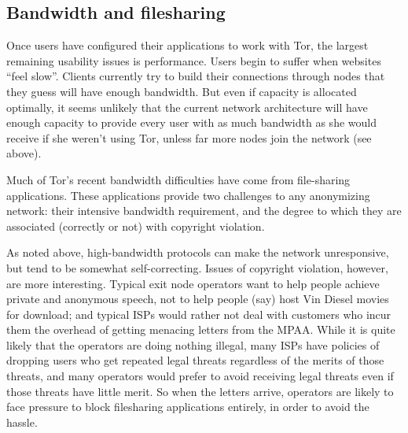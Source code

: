 \documentclass{llncs}
\begin{document}


\subsection{Bandwidth and filesharing}
\label{subsec:bandwidth-and-filesharing}
Once users have configured their applications to work with Tor, the largest
remaining usability issues is performance.  Users begin to suffer
when websites ``feel slow''.
Clients currently try to build their connections through nodes that they
guess will have enough bandwidth.  But even if capacity is allocated
optimally, it seems unlikely that the current network architecture will have
enough capacity to provide every user with as much bandwidth as she would
receive if she weren't using Tor, unless far more nodes join the network
(see above).


Much of Tor's recent bandwidth difficulties have come from file-sharing
applications.  These applications provide two challenges to
any anonymizing network: their intensive bandwidth requirement, and the
degree to which they are associated (correctly or not) with copyright
violation.

As noted above, high-bandwidth protocols can make the network unresponsive,
but tend to be somewhat self-correcting.  Issues of copyright violation,
however, are more interesting.  Typical exit node operators want to help
people achieve private and anonymous speech, not to help people (say) host
Vin Diesel movies for download; and typical ISPs would rather not
deal with customers who incur them the overhead of getting menacing letters
from the MPAA\@.  While it is quite likely that the operators are doing nothing
illegal, many ISPs have policies of dropping users who get repeated legal
threats regardless of the merits of those threats, and many operators would
prefer to avoid receiving legal threats even if those threats have little
merit.  So when the letters arrive, operators are likely to face
pressure to block filesharing applications entirely, in order to avoid the
hassle.
\end{document}

